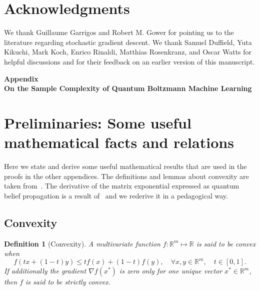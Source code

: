\documentclass[
    aps,
    prx,
    onecolumn
]{revtex4-2}
\newtheorem{definition}{Definition}
\begin{document}
\section*{Acknowledgments}
We thank Guillaume Garrigos and Robert M. Gower for pointing us to the literature regarding stochastic gradient descent. We thank Samuel Duffield, Yuta Kikuchi, Mark Koch, Enrico Rinaldi, Matthias Rosenkranz, and Oscar Watts for helpful discussions and for their feedback on an earlier version of this manuscript.

\let\oldaddcontentsline\addcontentsline
\renewcommand{\addcontentsline}[3]{}

\let\addcontentsline\oldaddcontentsline

\clearpage
\appendix
\onecolumngrid
\begin{center}
	\noindent\textbf{Appendix}\\
	\bigskip
	\noindent\textbf{\large{On the Sample Complexity of Quantum Boltzmann Machine Learning}}
\end{center}
\tableofcontents

\section{Preliminaries: Some useful mathematical facts and relations}
\label{app:mathfacts}

Here we state and derive some useful mathematical results that are used in the proofs in the other appendices. The definitions and lemmas about convexity are taken from~\cite{Garrigos2023}. The derivative of the matrix exponential expressed as quantum belief propagation is a result of~\cite{Hastings_2007} and we rederive it in a pedagogical way.

\subsection{Convexity}

\begin{definition}[Convexity]
\label{def:convexity}
A multivariate function $f:\mathbb{R}^m \mapsto \mathbb{R}$ is said to be convex when 
\begin{equation}
    f(tx + (1-t)y) \leq tf(x) + (1-t)f(y), \quad \forall x, y\in\mathbb{R}^m, \quad t\in [0, 1]. 
\end{equation}
If additionally the gradient $\nabla f(x^*)$ is zero only for one unique vector $x^* \in\mathbb{R}^m$, then $f$ is said to be strictly convex.
\end{definition}
\end{document}
